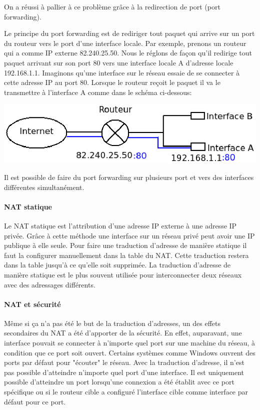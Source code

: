 On a réussi à pallier à ce problème grâce à la redirection de port (port 
forwarding). 

Le principe du port forwarding est de rediriger tout paquet qui arrive sur un
port du routeur vers le port d'une interface locale.
Par exemple, prenons un routeur qui a comme IP externe 82.240.25.50.
Nous le réglons de façon qu'il redirige tout paquet arrivant sur son port 80
vers une interface locale A d'adresse locale 192.168.1.1.
Imaginons qu'une interface sur le réseau essaie de se connecter à cette adresse
 IP au port 80.
Lorsque le routeur reçoit le paquet il va le transmettre à l'interface A comme
dans le schéma ci-dessous:

\includegraphics{./pics/port_forwarding.eps}

Il est possible de faire du port forwarding sur plusieurs port et vers des
interfaces différentes simultanément.

\paragraph{NAT statique}
Le NAT statique est l'attribution d'une adresse IP externe à une adresse IP 
privée. Grâce à cette méthode une interface sur un réseau privé peut avoir une
IP publique à elle seule. Pour faire une traduction d'adresse de manière statique il faut la configurer
manuellement dans la table du NAT. Cette traduction restera dans
la table jusqu'à ce qu'elle soit supprimée. La traduction d'adresse de manière statique
est le plus souvent utilisée pour interconnecter deux réseaux avec des
adressages différents.

\paragraph{NAT et sécurité}

Même si ça n'a pas été le but de la traduction d'adresses, un des effets
secondaires du NAT a été d'apporter de la sécurité. En effet, auparavant, une
interface pouvait se connecter à n'importe quel port sur une machine du réseau,
à condition que ce port soit ouvert. Certains systèmes comme Windows ouvrent des ports
par défaut pour "écouter" le réseau. Avec la traduction d'adresse, il n'est pas
possible d'atteindre n'importe quel port d'une interface. Il est uniquement
possible d'atteindre un port lorsqu'une connexion a été établit avec ce port
spécifique ou si le routeur cible a configuré l'interface cible comme interface
par défaut pour ce port.


